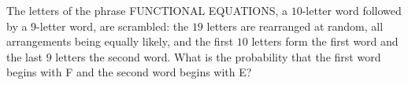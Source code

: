 The letters of the phrase FUNCTIONAL EQUATIONS, a $10$-letter word followed by a $9$-letter word, are scrambled: the $19$ letters are rearranged at random, all arrangements being equally likely, and the first $10$ letters form the first word and the last $9$ letters the second word. What is the probability that the first word begins with F and the second word begins with E?
